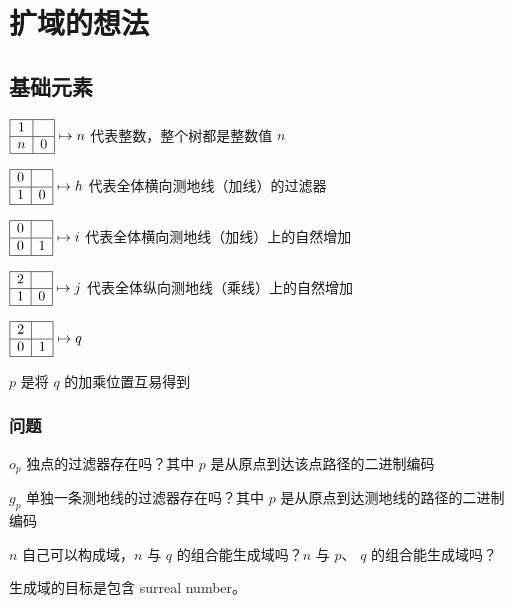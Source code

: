 \documentclass[a4paper,12pt]{article}
\begin{document}
\newpage

\section{扩域的想法}

\subsection{基础元素}

$\begin{array}{|c|c|}\hline 1&\space\\\hline n&0\\\hline\end{array} \mapsto n$ 代表整数，整个树都是整数值 $n$

$\begin{array}{|c|c|}\hline0&\space\\\hline 1&0\\\hline\end{array} \mapsto h$ 代表全体横向测地线（加线）的过滤器

$\begin{array}{|c|c|}\hline0&\space\\\hline 0&1\\\hline\end{array} \mapsto i$ 代表全体横向测地线（加线）上的自然增加

$\begin{array}{|c|c|}\hline2&\space\\\hline 1&0\\\hline\end{array} \mapsto j$ 代表全体纵向测地线（乘线）上的自然增加

$\begin{array}{|c|c|}\hline2&\space\\\hline 0&1\\\hline\end{array} \mapsto q$

$p$ 是将 $q$ 的加乘位置互易得到

\subsubsection{问题}

$o_p$ 独点的过滤器存在吗？其中 $p$ 是从原点到达该点路径的二进制编码

$g_p$ 单独一条测地线的过滤器存在吗？其中 $p$ 是从原点到达测地线的路径的二进制编码

$n$ 自己可以构成域，$n$ 与 $q$ 的组合能生成域吗？$n$ 与 $p$、 $q$ 的组合能生成域吗？

生成域的目标是包含 surreal number。
\end{document}

